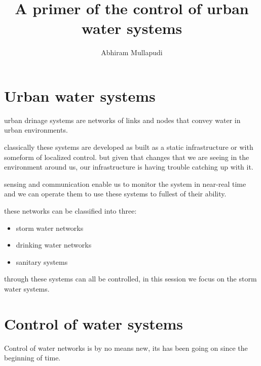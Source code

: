 \documentclass{article}
\title{A primer of the control of urban water systems}
\author{Abhiram Mullapudi}
\begin{document}
\maketitle

\section{Urban water systems}

urban drinage systems are networks of links and nodes that convey water in urban environments.

classically these systems are developed as built as a static infrastructure or with someform of localized control.
but given that changes that we are seeing in the environment around us, our infrastructure is having trouble catching up with it.

sensing and communication enable us to monitor the system in near-real time and we can operate them to use these systems to fullest of their ability. 

these networks can be classified into three:
\begin{itemize}
	\item storm water networks
	\item drinking water networks
	\item sanitary systems
\end{itemize}
through these systems can all be controlled, in this session we focus on the storm water systems.

\section{Control of water systems}
Control of water networks is by no means new, its has been going on since the beginning of time.  
\end{document}

